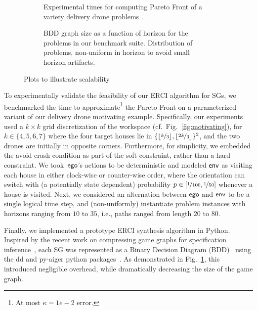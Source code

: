 \begin{figure*}
    \begin{subfigure}{0.5\textwidth}
  \centering
  \scalebox{0.58}{
    
    }
    \caption{
      Experimental times for computing Pareto Front of a variety
      delivery drone problems
      \label{fig:exp_times}.
    }
  \end{subfigure}
  \hfill
    \begin{subfigure}{0.5\textwidth}
    \centering \scalebox{0.53}{
      
    }
    \caption{
      BDD graph size as a function of horizon for the problems in our
      benchmark suite. Distribution of problems, non-uniform in horizon
      to avoid small horizon artifacts\label{fig:bdd_sizes}.
    }
  \end{subfigure}
  \caption{Plots to illustrate scalability} 
\end{figure*}

To experimentally validate the feasibility of our ERCI algorithm for
SGs, we benchmarked the time to approximate\footnote{At most $\kappa =
1e-2$ error.} the Pareto Front on a parameterized variant of our
delivery drone motivating example. Specifically, our experiments used
a $k\times k$ grid discretization of the workspace (cf.\ Fig.~\ref{fig:motivating}), for $k \in
\{4,5,6,7\}$ where the four target houses lie in
$\{\lfloor\nicefrac{k}{3}\rfloor, \lfloor\nicefrac{2k}{3}\rfloor
\}^2$, and the two drones are initially in opposite
corners. Furthermore, for simplicity, we embedded the avoid crash
condition as part of the soft constraint, rather than a hard
constraint\footnotemark. We took~$\mathsf{ego}$'s actions to be deterministic
and modeled $\mathsf{env}$ as visiting each house in either clock-wise or
counter-wise order, where the orientation can switch with
(a potentially state dependent) probability $p \in [\nicefrac{1}{100},
\nicefrac{1}{50}]$ whenever a house is visited. Next, we considered an
alternation between $\mathsf{ego}$ and $\mathsf{env}$ to be a single logical time
step, and (non-uniformly) instantiate problem instances with horizons
ranging from $10$ to $35$, i.e., paths ranged from length $20$ to
$80$.


Finally, we implemented a prototype ERCI synthesis algorithm in Python.
Inspired by the recent work on compressing game graphs for specification
inference~\cite{DBLP:conf/cav/Vazquez-Chanlatte20}, each SG was represented
as a Binary Decision Diagram (BDD)~\cite{DBLP:journals/csur/Bryant92} using the
dd and py-aiger python packages~\cite{dd, pyAiger}. As demonstrated in Fig.~\ref{fig:exp_times},
this introduced negligible overhead, while dramatically decreasing the size
of the game graph.\footnotemark 



